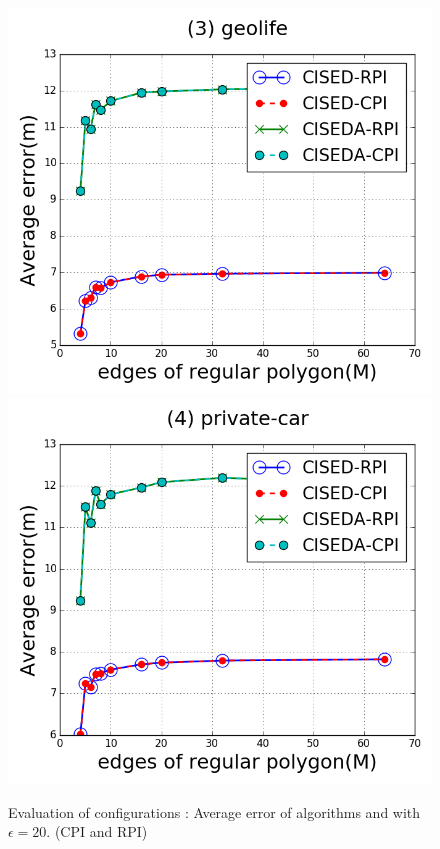\begin{figure}[tb!]
\includegraphics[scale = 0.250]{figures/Exp-M-e-20-error-geolife.png}
\includegraphics[scale = 0.250]{figures/Exp-M-e-20-error-private.png}
\vspace{-2ex}
\caption{\small Evaluation of configurations : Average error of algorithms \cist and \cista with $\epsilon = 20$. (CPI and RPI)}
\label{fig:m-error-e20}
\vspace{-1ex}
\end{figure}

